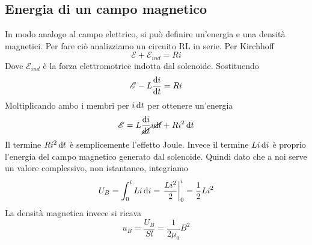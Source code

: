 \subsection{Energia di un campo magnetico}
In modo analogo al campo elettrico, si può definire un'energia e una densità magnetici. Per fare 
ciò analizziamo un circuito RL in serie. Per Kirchhoff
\begin{equation*}
  \mathcal{E} + \mathcal{E}_{ind} = Ri
\end{equation*}
Dove $\mathcal{E}_{ind}$ è la forza elettromotrice indotta dal solenoide. Sostituendo
\begin{equation*}
  \mathcal{E} -L\frac{\mathop{}\!\mathrm{d} i}{\mathop{}\!\mathrm{d} t} = Ri
\end{equation*}
Moltiplicando ambo i membri per $i\mathop{}\!\mathrm{d} t$ per ottenere un'energia
\begin{equation*}
  \mathcal{E} = L\frac{\mathop{}\!\mathrm{d} i}{\cancel{\mathop{}\!\mathrm{d} t}}i\cancel{\mathop{}\!\mathrm{d} t}+Ri^2\mathop{}\!\mathrm{d} t
\end{equation*}
Il termine $Ri^2\mathop{}\!\mathrm{d} t$ è semplicemente l'effetto Joule. Invece il termine $Li\mathop{}\!\mathrm{d} i$ è proprio
l'energia del campo magnetico generato dal solenoide. Quindi dato che a noi serve un valore
complessivo, non istantaneo, integriamo
\begin{equation*}
  U_B = \int_0^i Li\mathop{}\!\mathrm{d} i = \left.\frac{Li^2}{2}\right|_0^i = \frac{1}{2}Li^2
  \end{equation*}
  La densità magnetica invece si ricava
  \begin{equation*}
    u_B = \frac{U_B}{Sl} = \frac{1}{2\mu_0}B^2
  \end{equation*}

